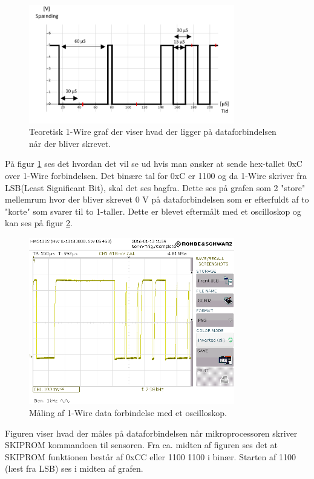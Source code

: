 \begin{figure}[h!]
  \centering
  \includegraphics[width=0.8\textwidth]{figures/onewire.png}
  \caption{Teoretisk 1-Wire graf der viser hvad der ligger på dataforbindelsen når der bliver skrevet.}
  \label{onewire_graph}
\end{figure}

På figur \ref{onewire_graph} ses det hvordan det vil se ud hvis man ønsker at sende hex-tallet 0xC over 1-Wire forbindelsen. Det binære tal for 0xC er 1100 og da 1-Wire skriver fra LSB(Least Significant Bit), skal det ses bagfra. Dette ses på grafen som 2 "store" mellemrum hvor der bliver skrevet 0 V på dataforbindelsen som er efterfuldt af to "korte" som svarer til to 1-taller. \newline Dette er blevet eftermålt med et oscilloskop og kan ses på figur \ref{SCR02}.


\begin{figure}[h!]
  \centering
  \includegraphics[width=0.8\textwidth]{figures/SCR02.png}
  \caption{Måling af 1-Wire data forbindelse med et oscilloskop.}
  \label{SCR02}
\end{figure}

Figuren viser hvad der måles på dataforbindelsen når mikroprocessoren skriver SKIPROM kommandoen til sensoren.
Fra ca. midten af figuren ses det at SKIPROM funktionen består af 0xCC eller 1100 1100 i binær. Starten af 1100 (læst fra LSB) ses i midten af grafen.